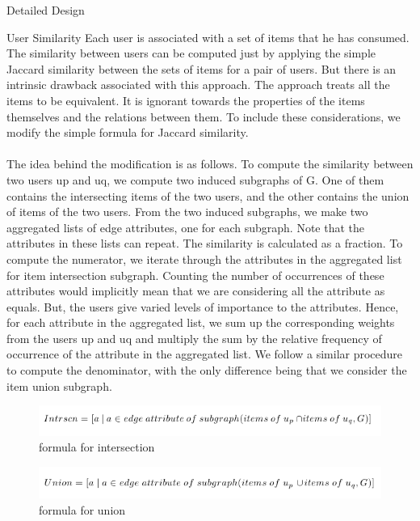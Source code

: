 \documentclass{report}
\begin{document}
\begin{projChapter}{Detailed Design}
\begin{projSection}{User Similarity}
            Each user is associated with a set of items that he has consumed. The similarity between users can be computed just by applying the simple Jaccard similarity between the sets of items for a pair of users. But there is an intrinsic drawback associated with this approach. The approach treats all the items to be equivalent. It is ignorant towards the properties of the items themselves and the relations between them. To include these considerations, we modify the simple formula for Jaccard similarity.
            ~\\\\
            The idea behind the modification is as follows. To compute the similarity between two users up and uq, we compute two induced subgraphs of G. One of them contains the intersecting items of the two users, and the other contains the union of items of the two users. From the two induced subgraphs, we make two aggregated lists of edge attributes, one for each subgraph. Note that the attributes in these lists can repeat. The similarity is calculated as a fraction. To compute the numerator, we iterate through the attributes in the aggregated list for item intersection subgraph. Counting the number of occurrences of these attributes would implicitly mean that we are considering all the attribute as equals. But, the users give varied levels of importance to the attributes. Hence, for each attribute in the aggregated list, we sum up the corresponding weights from the users up and uq and multiply the sum by the relative frequency of occurrence of the attribute in the aggregated list. We follow a similar procedure to compute the denominator, with the only difference being that we consider the item union subgraph.
            \begin{figure}[ht!]
\centering
\includegraphics[scale=0.6]{images/intersection.png}
\caption{formula for intersection}
\label{intersection}
\end{figure}

\begin{figure}[ht!]
\centering
\includegraphics[scale=0.6]{images/union.png}
\caption{formula for union}
\label{union}
\end{figure}


\end{projSection}
\end{projChapter}
\end{document}
